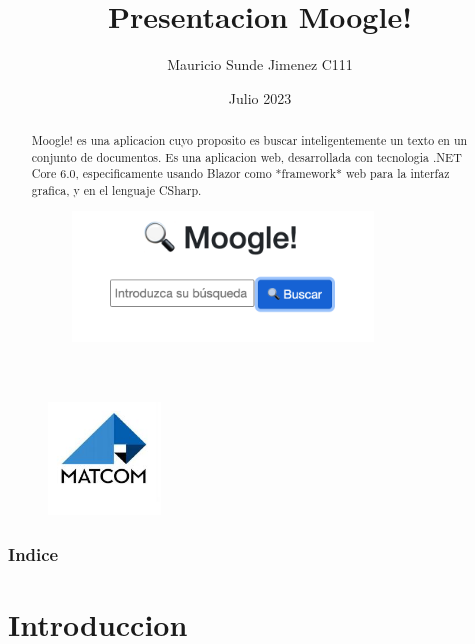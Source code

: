 \documentclass{beamer}
\title[Título]{Presentacion Moogle!}
\author{Mauricio Sunde Jimenez C111}
\institute[UGR]{
Universidad de La Habana
}
\date{Julio 2023}
\begin{document}
\begin{frame}
\titlepage
\begin{figure}[h]
	\center
    \includegraphics[width=3cm]{Pictures For Moogle!/matcom.jpg}
    \label{fig:logo}
\end{figure}
\end{frame}

\begin{abstract}
	Moogle! es una aplicacion cuyo proposito es buscar inteligentemente un texto en un conjunto de documentos. Es una aplicacion web, desarrollada con tecnologia .NET Core 6.0, especificamente usando Blazor como *framework* web para la interfaz grafica, y en el lenguaje CSharp.

\begin{figure}[h]
	\center
    \includegraphics[width=8cm]{Pictures For Moogle!/Picture1.png}
    \label{fig:logo}
\end{figure}

\end{abstract}


\begin{frame}
\frametitle{Indice} 
\tableofcontents
\end{frame}

\section{Introduccion}
\end{document}
